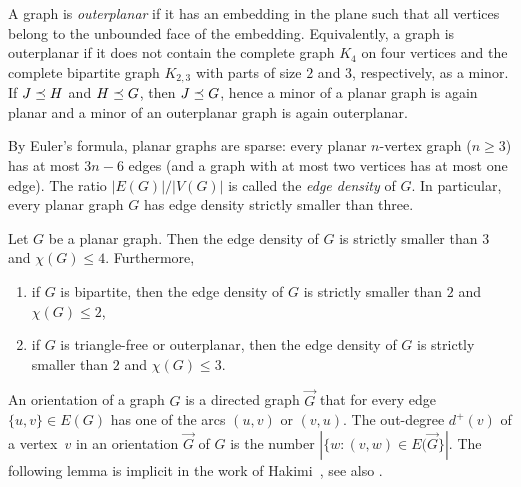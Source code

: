 A graph is \emph{outerplanar} if it has an embedding in the plane such
that all vertices belong to the unbounded face of the embedding.
Equivalently, a graph is outerplanar if it does not contain the
complete graph $K_4$ on four vertices and the complete bipartite graph
$K_{2,3}$ with parts of size $2$ and $3$, respectively, as a minor. If
$J\preceq H$ and $H\preceq G$, then $J\preceq G$, hence a minor of a
planar graph is again planar and a minor of an outerplanar graph is
again outerplanar.


By Euler's formula, planar graphs are sparse: every planar $n$-vertex
graph ($n\geq 3$) has at most $3n-6$ edges (and a graph with at most
two vertices has at most one edge). The ratio $|E(G)|/|V(G)|$ is
called the \emph{edge density} of $G$. In particular, every planar
graph $G$ has edge density strictly smaller than three.

\begin{lemma}\label{lem:densities}
  Let $G$ be a planar graph. Then the edge density of $G$ is strictly
  smaller than $3$ and $\chi(G)\leq 4$. Furthermore,

  \vspace{-2mm}
  \begin{enumerate}
  \item if $G$ is bipartite, then the edge density of $G$ is strictly
    smaller than $2$ and $\chi(G)\leq 2$,\smallskip
  \item if $G$ is triangle-free or outerplanar, then the edge density
    of $G$ is strictly smaller than $2$ and $\chi(G)\leq 3$.
  \end{enumerate}
\end{lemma}

An orientation of a graph $G$ is a directed graph $\vec{G}$ that
for every edge $\{u,v\}\in E(G)$ has one of the arcs $(u,v)$ or
$(v,u)$. The out-degree $d^+(v)$ of a vertex~$v$ in an orientation $\vec{G}$ 
of $G$ is the number $|\{ w : (v,w)\in E(\vec{G}\}|$. The following
lemma is implicit in the work of Hakimi~\cite{sup_orie}, see also 
\mbox{\cite[Proposition 3.3]{nevsetvril2012sparsity}}. 


